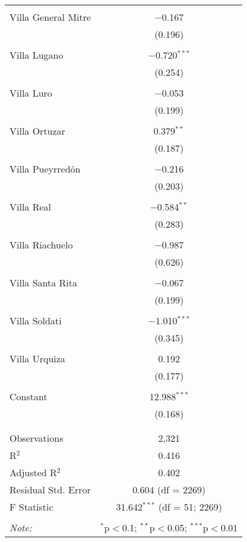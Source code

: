 \begin{table}[!htbp]
\begin{tabular}{@{\extracolsep{5pt}}lc}
  & \\ 
 Villa General Mitre & $-$0.167 \\ 
  & (0.196) \\ 
  & \\ 
 Villa Lugano & $-$0.720$^{***}$ \\ 
  & (0.254) \\ 
  & \\ 
 Villa Luro & $-$0.053 \\ 
  & (0.199) \\ 
  & \\ 
 Villa Ortuzar & 0.379$^{**}$ \\ 
  & (0.187) \\ 
  & \\ 
 Villa Pueyrredón & $-$0.216 \\ 
  & (0.203) \\ 
  & \\ 
 Villa Real & $-$0.584$^{**}$ \\ 
  & (0.283) \\ 
  & \\ 
 Villa Riachuelo & $-$0.987 \\ 
  & (0.626) \\ 
  & \\ 
 Villa Santa Rita & $-$0.067 \\ 
  & (0.199) \\ 
  & \\ 
 Villa Soldati & $-$1.010$^{***}$ \\ 
  & (0.345) \\ 
  & \\ 
 Villa Urquiza & 0.192 \\ 
  & (0.177) \\ 
  & \\ 
 Constant & 12.988$^{***}$ \\ 
  & (0.168) \\ 
  & \\ 
\hline \\[-1.8ex] 
Observations & 2,321 \\ 
R$^{2}$ & 0.416 \\ 
Adjusted R$^{2}$ & 0.402 \\ 
Residual Std. Error & 0.604 (df = 2269) \\ 
F Statistic & 31.642$^{***}$ (df = 51; 2269) \\ 
\hline 
\hline \\[-1.8ex] 
\textit{Note:}  & \multicolumn{1}{r}{$^{*}$p$<$0.1; $^{**}$p$<$0.05; $^{***}$p$<$0.01} \\ 
\end{tabular} 
\end{table} 
